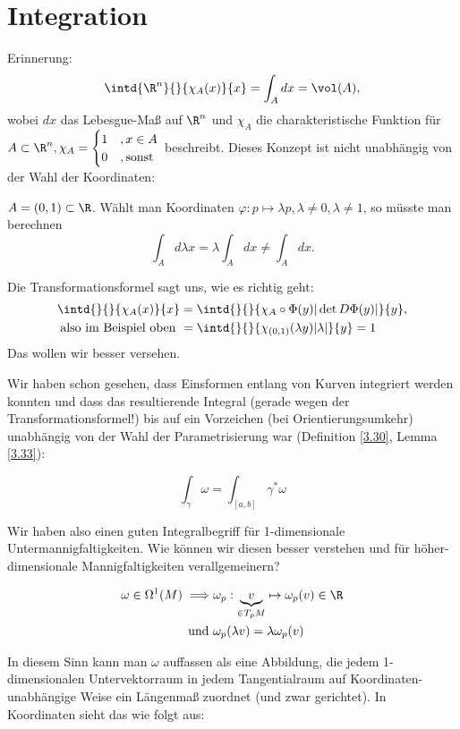 \chapter{Integration}
\lecture

Erinnerung: 
	\[ \intd{\R^n}{}{\chi_A(x)}{x} = \int_A dx = \vol(A), \]
	wobei $dx$ das Lebesgue-Maß auf $\R^n$ und $\chi_A$ die charakteristische Funktion für $A \subset \R^n, \chi_A = \begin{cases}
		1 &, x \in A \\ 0  &, \text{sonst}
	\end{cases}$ beschreibt. Dieses Konzept ist nicht unabhängig von der Wahl der Koordinaten:

\begin{exmp*}
	\( A = (0,1) \subset \R \). Wählt man Koordinaten \( \varphi: p \mapsto \lambda p, \lambda \neq 0, \lambda \neq 1 \), so müsste man berechnen
	\[ \int_A d\lambda x = \lambda \int_A dx \neq \int_A dx. \]
\end{exmp*}

Die Transformationsformel sagt uns, wie es richtig geht:
\begin{align*}
	\intd{}{}{\chi_A(x)}{x} &= \intd{}{}{\chi_A \circ \Phi(y) |\det D\Phi(y)|}{y},\\
	\text{also im Beispiel oben } &= \intd{}{}{\chi_{(0,1)} (\lambda y) |\lambda|}{y} = 1
\end{align*}
Das wollen wir besser versehen.

Wir haben schon gesehen, dass Einsformen entlang von Kurven integriert werden konnten und dass das resultierende Integral (gerade wegen der Transformationsformel!) bis auf ein Vorzeichen (bei Orientierungsumkehr) unabhängig von der Wahl der Parametrisierung war (Definition \ref{3.30}, Lemma \ref{3.33}):

\[ \int_\gamma \omega = \int_{[a,b]} \gamma^*\omega \]

Wir haben also einen guten Integralbegriff für 1-dimensionale Untermannigfaltigkeiten. Wie können wir diesen besser verstehen und für höher-dimensionale Mannigfaltigkeiten verallgemeinern?

\begin{align*}
	\omega \in \Omega^1(M) \implies &\omega_p: \underbrace{v}_{\in T_pM} \mapsto \omega_p(v) \in \R\\
	\text{und } &\omega_p (\lambda v) = \lambda \omega_p(v)
\end{align*}

In diesem Sinn kann man $\omega$ auffassen als eine Abbildung, die jedem 1-dimensionalen Untervektorraum in jedem Tangentialraum auf Koordinaten-unabhängige Weise ein Längenmaß zuordnet (und zwar gerichtet). In Koordinaten sieht das wie folgt aus:

